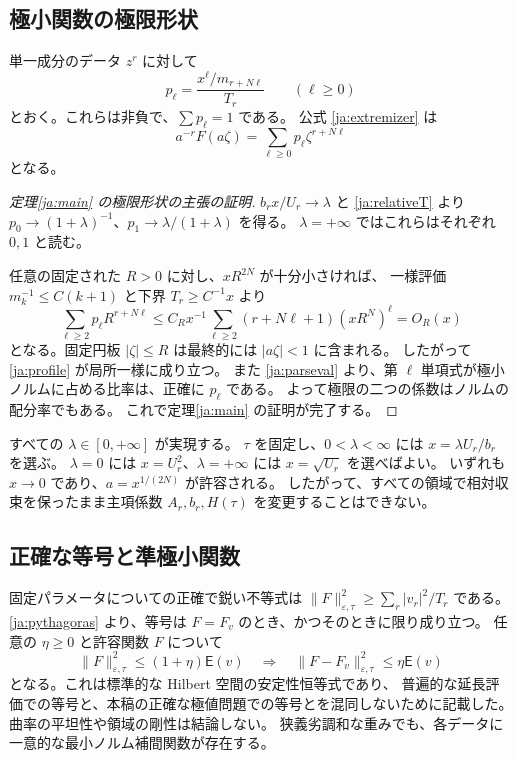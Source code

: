 \documentclass[12pt]{amsart}
\theoremstyle{definition}
\theoremstyle{remark}
\numberwithin{equation}{section}
\newcommand{\Cost}{\mathsf E}
\theoremstyle{definition}
\begin{document}
\subsection{極小関数の極限形状}
単一成分のデータ $z^r$ に対して
\begin{equation}\label{ja:probabilities}
 p_\ell=\frac{x^\ell/m_{r+N\ell}}{T_r}\qquad(\ell\ge0)
\end{equation}
とおく。これらは非負で、$\sum p_\ell=1$ である。
公式 \eqref{ja:extremizer} は
\begin{equation}\label{ja:scaledseries}
 a^{-r}F(a\zeta)=\sum_{\ell\ge0}p_\ell\zeta^{r+N\ell}
\end{equation}
となる。\begin{proof}[定理\ref{ja:main} の極限形状の主張の証明]
$b_rx/U_r\to\lambda$ と \eqref{ja:relativeT} より
$p_0\to(1+\lambda)^{-1}$、$p_1\to\lambda/(1+\lambda)$ を得る。
$\lambda=+\infty$ ではこれらはそれぞれ $0,1$ と読む。

任意の固定された $R>0$ に対し、$xR^{2N}$ が十分小さければ、
一様評価 $m_k^{-1}\le C(k+1)$ と下界 $T_r\ge C^{-1}x$ より
\[
 \sum_{\ell\ge2}p_\ell R^{r+N\ell}
 \le C_R x^{-1}\sum_{\ell\ge2}(r+N\ell+1)(xR^N)^\ell
 =O_R(x)
\]
となる。固定円板 $|\zeta|\le R$ は最終的には $|a\zeta|<1$ に含まれる。
したがって \eqref{ja:profile} が局所一様に成り立つ。
また \eqref{ja:parseval} より、第 $\ell$ 単項式が極小ノルムに占める比率は、正確に $p_\ell$ である。
よって極限の二つの係数はノルムの配分率でもある。
これで定理\ref{ja:main} の証明が完了する。
\end{proof}

すべての $\lambda\in[0,+\infty]$ が実現する。
$\tau$ を固定し、$0<\lambda<\infty$ には $x=\lambda U_r/b_r$ を選ぶ。
$\lambda=0$ には $x=U_r^2$、$\lambda=+\infty$ には $x=\sqrt{U_r}$ を選べばよい。
いずれも $x\to0$ であり、$a=x^{1/(2N)}$ が許容される。
したがって、すべての領域で相対収束を保ったまま主項係数 $A_r,b_r,H(\tau)$ を変更することはできない。

\subsection{正確な等号と準極小関数}
固定パラメータについての正確で鋭い不等式は
$\|F\|_{\varepsilon,\tau}^2\ge\sum_r|v_r|^2/T_r$ である。
\eqref{ja:pythagoras} より、等号は $F=F_v$ のとき、かつそのときに限り成り立つ。
任意の $\eta\ge0$ と許容関数 $F$ について
\[
 \|F\|_{\varepsilon,\tau}^2\le(1+\eta)\Cost(v)
 \quad\Longrightarrow\quad
 \|F-F_v\|_{\varepsilon,\tau}^2\le\eta\Cost(v)
\]
となる。これは標準的な Hilbert 空間の安定性恒等式であり、
普遍的な延長評価での等号と、本稿の正確な極値問題での等号とを混同しないために記載した。
曲率の平坦性や領域の剛性は結論しない。
狭義劣調和な重みでも、各データに一意的な最小ノルム補間関数が存在する。
\end{document}
